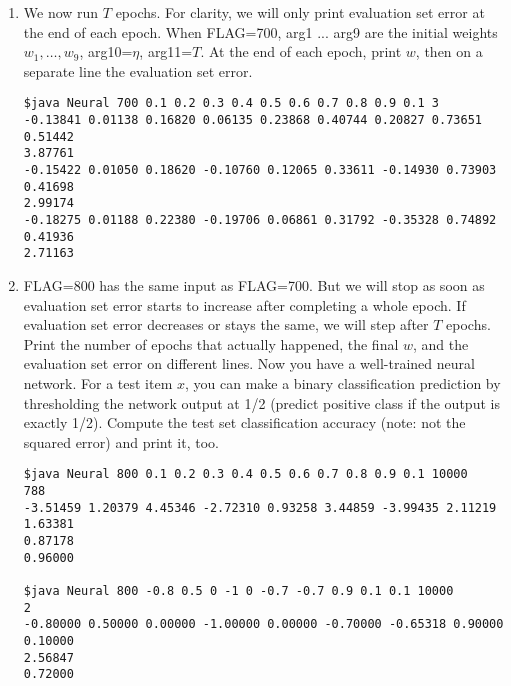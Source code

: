 \documentclass{article}
\begin{document}
\begin{enumerate}
\item
We now run $T$ epochs.  For clarity, we will only print evaluation set error at the end of each epoch.
When FLAG=700, arg1 ... arg9 are the initial weights $w_1, \ldots, w_9$, arg10=$\eta$, arg11=$T$.
At the end of each epoch, print $w$, then on a separate line the evaluation set error.
\begin{verbatim}
$java Neural 700 0.1 0.2 0.3 0.4 0.5 0.6 0.7 0.8 0.9 0.1 3
-0.13841 0.01138 0.16820 0.06135 0.23868 0.40744 0.20827 0.73651 0.51442
3.87761
-0.15422 0.01050 0.18620 -0.10760 0.12065 0.33611 -0.14930 0.73903 0.41698
2.99174
-0.18275 0.01188 0.22380 -0.19706 0.06861 0.31792 -0.35328 0.74892 0.41936
2.71163
\end{verbatim}

\item
FLAG=800 has the same input as FLAG=700.
But we will stop as soon as evaluation set error starts to increase after completing a whole epoch.
If evaluation set error decreases or stays the same, we will step after $T$ epochs.
Print the number of epochs that actually happened, the final $w$, and the evaluation set error on different lines.
Now you have a well-trained neural network.
For a test item $x$, you can make a binary classification prediction by thresholding the network output at 1/2 (predict positive class if the output is exactly 1/2).
Compute the test set classification accuracy (note: not the squared error) and print it, too.
\begin{verbatim}
$java Neural 800 0.1 0.2 0.3 0.4 0.5 0.6 0.7 0.8 0.9 0.1 10000
788
-3.51459 1.20379 4.45346 -2.72310 0.93258 3.44859 -3.99435 2.11219 1.63381
0.87178
0.96000

$java Neural 800 -0.8 0.5 0 -1 0 -0.7 -0.7 0.9 0.1 0.1 10000
2
-0.80000 0.50000 0.00000 -1.00000 0.00000 -0.70000 -0.65318 0.90000 0.10000
2.56847
0.72000
\end{verbatim}

\end{enumerate}
\end{document}
